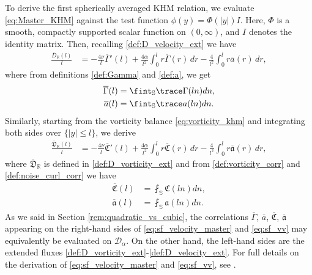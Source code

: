 \documentclass[11pt,a4paper]{article}
\numberwithin{equation}{section}
\numberwithin{theorem}{section}
\numberwithin{remark}{section}
\numberwithin{definition}{section}
\begin{document}
To derive the first spherically averaged KHM relation, we evaluate \eqref{eq:Master_KHM} against the test function $\phi(y) = \Phi(|y|)I$. Here, $\Phi$ is a smooth, compactly supported scalar function on $(0, \infty)$, and $I$ denotes the identity matrix. Then, recalling \eqref{def:D_velocity_ext} we have
\begin{align}
    \frac{\overline{D}_{\mathbb{R}}(l)}{l} &= -\frac{4\nu}{l}\overline{\Gamma}'(l) + \frac{4\alpha}{l^2}\int_0^l r\overline{\Gamma}(r) \, dr - \frac{4}{l^2}\int_0^l r\overline{a}(r) \, dr, \label{eq:sf_velocity_master}
\end{align}
where from definitions \eqref{def:Gamma} and \eqref{def:a}, we get 
\begin{align}
    \overline{\Gamma}(l)&=\fint_{\mathbb{S}}\trace\Gamma(ln)dn,\\
    \overline{a}(l)&=\fint_{\mathbb{S}}\trace a(ln)dn.
\end{align}
Similarly, starting from the vorticity balance \eqref{eq:vorticity_khm} and integrating both sides over $\{|y|\leq l\}$, we derive 
\begin{align}
    \frac{\overline{\mathfrak{D}}_{\mathbb{R}}(l)}{l} &= -\frac{4\nu}{l}\overline{\mathfrak{C}}'(l) + \frac{4\alpha}{l^2}\int_0^l r\overline{\mathfrak{C}}(r) \, dr - \frac{4}{l^2}\int_0^l r\overline{\mathfrak{a}}(r) \, dr, \label{eq:sf_vv}
\end{align}
where $\overline{\mathfrak{D}}_{\mathbb{R}}$ is defined in \eqref{def:D_vorticity_ext}
and from \eqref{def:vorticity_corr} and \eqref{def:noise_curl_corr} we have
\begin{align}
    \overline{\mathfrak{C}}(l)&=\fint_{\mathbb{S}}\mathfrak{C}(ln)dn,\\
    \overline{\mathfrak{a}}(l)&=\fint_{\mathbb{S}}\mathfrak{a}(ln)dn.
\end{align}
As we said in Section \ref{rem:quadratic_vs_cubic}, the correlations $\overline{\Gamma}$, $\overline{a}$, $\overline{\mathfrak{C}}$, $\overline{\mathfrak{a}}$ appearing on the right-hand sides of \eqref{eq:sf_velocity_master} and \eqref{eq:sf_vv}
may equivalently be evaluated on $\mathcal{D}_\alpha$. On
the other hand, the left-hand sides are the extended fluxes
\eqref{def:D_vorticity_ext}-\eqref{def:D_velocity_ext}. For full details on
the derivation of \eqref{eq:sf_velocity_master} and \eqref{eq:sf_vv}, see
\cite{YuriAmiraliGigliola}.
\end{document}
